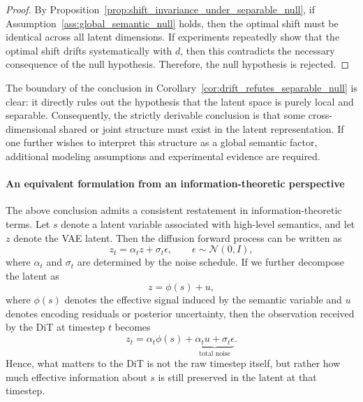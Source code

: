 \begin{proof}
By Proposition~\ref{prop:shift_invariance_under_separable_null}, if Assumption~\ref{ass:global_semantic_null} holds, then the optimal shift must be identical across all latent dimensions. If experiments repeatedly show that the optimal shift drifts systematically with $d$, then this contradicts the necessary consequence of the null hypothesis. Therefore, the null hypothesis is rejected.
\end{proof}

The boundary of the conclusion in Corollary~\ref{cor:drift_refutes_separable_null} is clear: it directly rules out the hypothesis that the latent space is purely local and separable. Consequently, the strictly derivable conclusion is that some cross-dimensional shared or joint structure must exist in the latent representation. If one further wishes to interpret this structure as a global semantic factor, additional modeling assumptions and experimental evidence are required.

\paragraph{An equivalent formulation from an information-theoretic perspective}

The above conclusion admits a consistent restatement in information-theoretic terms. Let $s$ denote a latent variable associated with high-level semantics, and let $z$ denote the VAE latent. Then the diffusion forward process can be written as
\begin{equation}
z_t=\alpha_t z+\sigma_t\epsilon,
\qquad
\epsilon\sim\mathcal N(0,I),
\label{eq:diffusion_forward_latent}
\end{equation}
where $\alpha_t$ and $\sigma_t$ are determined by the noise schedule. If we further decompose the latent as
\begin{equation}
z=\phi(s)+u,
\label{eq:latent_signal_noise_decomposition}
\end{equation}
where $\phi(s)$ denotes the effective signal induced by the semantic variable and $u$ denotes encoding residuals or posterior uncertainty, then the observation received by the DiT at timestep $t$ becomes
\begin{equation}
z_t=\alpha_t\phi(s)+\underbrace{\alpha_t u+\sigma_t\epsilon}_{\text{total noise}}.
\label{eq:effective_noisy_channel}
\end{equation}
Hence, what matters to the DiT is not the raw timestep itself, but rather how much effective information about $s$ is still preserved in the latent at that timestep.

